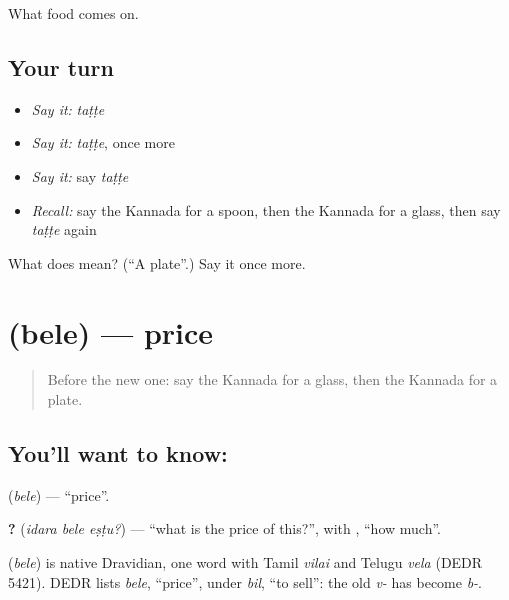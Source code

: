 \begin{grammarlens}[title={What you've built}]
What food comes on.
\end{grammarlens}

\subsection*{Your turn}
\begin{itemize}
\raggedright
  \item \emph{Say it:} \emph{taṭṭe}
  \item \emph{Say it:} \emph{taṭṭe}, once more
  \item \emph{Say it:} say \emph{taṭṭe}
  \item \emph{Recall:} say the Kannada for a spoon, then the Kannada for a glass, then say \emph{taṭṭe} again
\end{itemize}

\begin{tcolorbox}[breakable,colback=teal!4,colframe=teal!35!black,title={Before you move on}]
What does  mean? (\textquotedblleft{}A plate\textquotedblright{}.) Say it once more.
\end{tcolorbox}
\section[\texorpdfstring{\kn{ಬೆಲೆ} (bele)}{ಬೆಲೆ (bele)}]{ (bele) — price}

\label{lesson:KA-C94-price}



\begin{quote}
Before the new one: say the Kannada for a glass, then the Kannada for a plate.
\end{quote}

\subsection*{You'll want to know: }
\textbf{} (\emph{bele}) — \textquotedblleft{}price\textquotedblright{}.

\textbf{  ?} (\emph{idara bele eṣṭu?}) — \textquotedblleft{}what is the price of this?\textquotedblright{}, with \textbf{}, \textquotedblleft{}how much\textquotedblright{}.

\begin{cousinweb}
\textbf{} (\emph{bele}) is native Dravidian, one word with Tamil \emph{vilai} and Telugu \emph{vela} (DEDR 5421). DEDR lists \emph{bele}, \textquotedblleft{}price\textquotedblright{}, under \emph{bil}, \textquotedblleft{}to sell\textquotedblright{}: the old \emph{v-} has become \emph{b-}.
\end{cousinweb}

